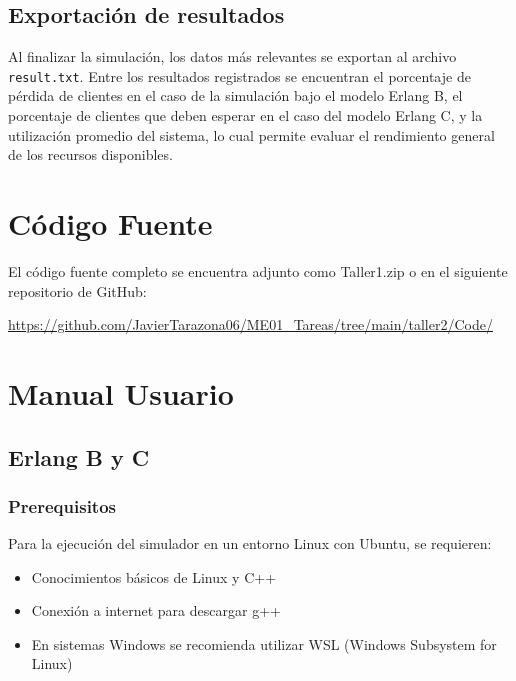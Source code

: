 \documentclass{article}
\begin{document}
\subsection{Exportación de resultados}

Al finalizar la simulación, los datos más relevantes se exportan al archivo \texttt{result.txt}. Entre los resultados registrados se encuentran el porcentaje de pérdida de clientes en el caso de la simulación bajo el modelo Erlang B, el porcentaje de clientes que deben esperar en el caso del modelo Erlang C, y la utilización promedio del sistema, lo cual permite evaluar el rendimiento general de los recursos disponibles.



\section{Código Fuente}\label{sec:cod}

El código fuente completo se encuentra adjunto como Taller1.zip
o en el siguiente repositorio de GitHub:

\begin{center}
\url{https://github.com/JavierTarazona06/ME01_Tareas/tree/main/taller2/Code/}
\end{center}



\section{Manual Usuario}\label{sec:man_u}

\subsection{Erlang B y C}\label{subsec:erlang_bc}

\subsubsection{Prerequisitos}
Para la ejecución del simulador en un entorno Linux con Ubuntu, se requieren:
\begin{itemize}
    \item Conocimientos básicos de Linux y C++
    \item Conexión a internet para descargar g++
    \item En sistemas Windows se recomienda utilizar WSL (Windows Subsystem for Linux)
\end{itemize}
\end{document}
